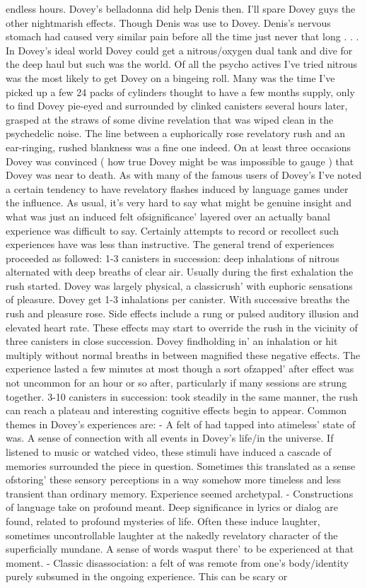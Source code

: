 \documentclass[12pt]{book}
\begin{document}
endless hours. Dovey's belladonna did help Denis then. I'll spare Dovey guys the other nightmarish effects. Though Denis was use to Dovey. Denis's nervous stomach had caused very similar pain before all the time just never that long . . . In Dovey's ideal world Dovey could get a nitrous/oxygen dual tank and dive for the deep haul but such was the world. Of all the psycho actives I've tried nitrous was the most likely to get Dovey on a bingeing roll. Many was the time I've picked up a few 24 packs of cylinders thought to have a few months supply, only to find Dovey pie-eyed and surrounded by clinked canisters several hours later, grasped at the straws of some divine revelation that was wiped clean in the psychedelic noise. The line between a euphorically rose revelatory rush and an ear-ringing, rushed blankness was a fine one indeed. On at least three occasions Dovey was convinced ( how true Dovey might be was impossible to gauge ) that Dovey was near to death. As with many of the famous users of Dovey's I've noted a certain tendency to have revelatory flashes induced by language games under the influence. As usual, it's very hard to say what might be genuine insight and what was just an induced felt ofsignificance' layered over an actually banal experience was difficult to say. Certainly attempts to record or recollect such experiences have was less than instructive. The general trend of experiences proceeded as followed: 1-3 canisters in succession: deep inhalations of nitrous alternated with deep breaths of clear air. Usually during the first exhalation the rush started. Dovey was largely physical, a classicrush' with euphoric sensations of pleasure. Dovey get 1-3 inhalations per canister. With successive breaths the rush and pleasure rose. Side effects include a rung or pulsed auditory illusion and elevated heart rate. These effects may start to override the rush in the vicinity of three canisters in close succession. Dovey findholding in' an inhalation or hit multiply without normal breaths in between magnified these negative effects. The experience lasted a few minutes at most though a sort ofzapped' after effect was not uncommon for an hour or so after, particularly if many sessions are strung together. 3-10 canisters in succession: took steadily in the same manner, the rush can reach a plateau and interesting cognitive effects begin to appear. Common themes in Dovey's experiences are: - A felt of had tapped into atimeless' state of was. A sense of connection with all events in Dovey's life/in the universe. If listened to music or watched video, these stimuli have induced a cascade of memories surrounded the piece in question. Sometimes this translated as a sense ofstoring' these sensory perceptions in a way somehow more timeless and less transient than ordinary memory. Experience seemed archetypal. - Constructions of language take on profound meant. Deep significance in lyrics or dialog are found, related to profound mysteries of life. Often these induce laughter, sometimes uncontrollable laughter at the nakedly revelatory character of the superficially mundane. A sense of words wasput there' to be experienced at that moment. - Classic disassociation: a felt of was remote from one's body/identity purely subsumed in the ongoing experience. This can be scary or 
\end{document}
